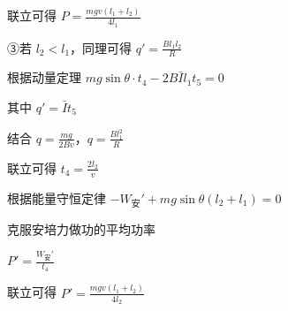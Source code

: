 \documentclass[\gkver]{gaokaozhenti}
\begin{document}
\begin{enumerate}
{联立可得 $P = \frac{mgv(l_{1} + l_{2})}{4l_{1}}$

③若 $l_{2} < l_{1}$，同理可得 $q' = \frac{Bl_{1}l_{2}}{R}$

根据动量定理 $mg\sin\theta \cdot t_{4} - 2B\bar{I}l_{1}t_{5} = 0$

其中 $q' = \bar{I}t_{5}$

结合 $q = \frac{mg}{2Bv}$，$q = \frac{Bl_{1}^{2}}{R}$

联立可得 $t_{4} = \frac{2l_{2}}{v}$

根据能量守恒定律 $-W_{\text{安}}' + mg\sin\theta(l_{2} + l_{1}) = 0$

克服安培力做功的平均功率

$P' = \frac{W_{\text{安}}'}{t_{4}}$

联立可得 $P' = \frac{mgv(l_{1} + l_{2})}{4l_{2}}$
}

\end{enumerate}
\end{document}
